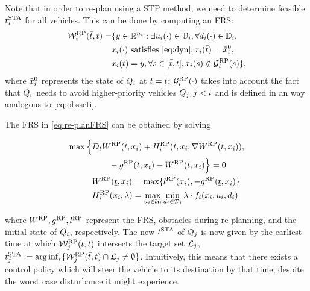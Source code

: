 Note that in order to re-plan using a STP method, we need to determine feasible $t^\text{STA}_i$ for all vehicles. This can be done by computing an FRS:
\begin{equation} \label{eq:re-planFRS}
\begin{aligned} 
\frs_i^{\text{RP}}(\tea, t) = & \{y \in \R^{n_i}: \exists \ctrl_i(\cdot) \in \cfset_i, \forall \dstb_i(\cdot) \in \dfset_i, \\
& \state_i(\cdot) \text{ satisfies \eqref{eq:dyn}}, \state_i(\tea) = \tilde{\state}_i^0, \\
& \state_i(t) = y, \forall s \in [\tea, t], \state_i(s) \notin \obsset_i^{\text{RP}}(s) \},
\end{aligned}
\end{equation}
\noindent where $\tilde{x}_i^0$ represents the state of $Q_i$ at $t = \bar{t}$; $\mathcal{G}_i^{\text{RP}}(\cdot)$ takes into account the fact that $Q_i$ needs to avoid higher-priority vehicles $Q_j, j<i$ and is defined in an way analogous to \eqref{eq:obsseti}.

The FRS in \eqref{eq:re-planFRS} can be obtained by solving %

\begin{equation}
\begin{aligned}
\max \Big\{&D_t W^{\text{RP}}(t, x_i) + H_i^{\text{RP}}(t, x_i, \nabla W^{\text{RP}}(t, x_i)), \\
&\qquad - g^{\text{RP}}(t, x_i) - W^{\text{RP}}(t, x_i) \Big\} = 0\\
&W^{\text{RP}}(\underline{t}, x_i) = \max\{l^{\text{RP}}(x_i), -g^{\text{RP}}(\underline{t}, x_i)\} \\
&H_i^{\text{RP}}(x_i, \lambda) = \max_{u_i \in \mathcal{U}_i} \min_{d_i \in \mathcal{D}_i} \lambda \cdot f_i (x_i, u_i, d_i)
\end{aligned}
\end{equation} 

\noindent where $W^{\text{RP}}, g^{\text{RP}}, l^{\text{RP}}$ represent the FRS, obstacles during re-planning, and the initial state of $Q_i$, respectively. The new $t^\text{STA}$ of $Q_j$ is now given by the earliest time at which $\mathcal{W}_j^{\text{RP}}(\bar{t}, t)$ intersects the target set $\mathcal{L}_j$, $t^\text{STA}_j := \arg \inf_t \{ \mathcal{W}_j^{\text{RP}}(\bar{t}, t) \cap \mathcal{L}_j \neq \emptyset \}$. Intuitively, this means that there exists a control policy which will steer the vehicle to its destination by that time, despite the worst case disturbance it might experience.   

